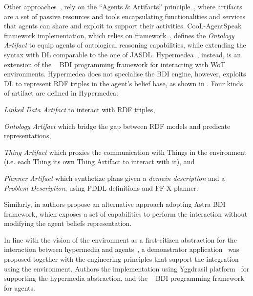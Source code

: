 \documentclass[
]{ceurart}
\begin{document}
%
Other approaches~\cite{DBLP:journals/wias/MascardiABBR14,DBLP:conf/www/CharpenayZLB22, DBLP:conf/semweb/ONeillBBC21, DBLP:conf/emas/CiorteaBR18},
rely on the ``Agents \& Artifacts'' principle~\cite{DBLP:conf/promas/RicciVO05}, 
where artifacts are a set of passive resources and tools encapsulating functionalities and services
that agents can share and exploit to support their activities.
%
CooL-AgentSpeak~\cite{DBLP:journals/wias/MascardiABBR14} framework implementation,
which relies on \cartago{} framework~\cite{DBLP:books/sp/09/RicciPVO09},
defines the \emph{Ontology Artifact} to equip agents of ontological reasoning capabilities,
while extending the syntax with \ac{DL} comparable to the one of JASDL.
%
Hypermedea~\cite{DBLP:conf/www/CharpenayZLB22}, instead,
is an extension of the \jacamo{}~\cite{BOISSIER2013747} \ac{BDI} programming framework
for interacting with \ac{WoT} environments.
%
Hypermedea does not specialise the \ac{BDI} engine, 
however,
exploits \ac{DL} to represent \ac{RDF} triples in the agent's belief base, 
as shown in .
%
Four kinds of artifact are defined in Hypermedea: 
\begin{inlinelist}
  \item \textit{Linked Data Artifact} to interact with \ac{RDF} triples,
  \item \textit{Ontology Artifact} which bridge the gap between \ac{RDF} models and predicate representations,
  \item \textit{Thing Artifact} which proxies the communication with Things in the environment (i.e. each Thing its own Thing Artifact to interact with it), and
  \item \textit{Planner Artifact} which synthetize plans given a \textit{domain description} and a \textit{Problem Description}, using PDDL definitions and FF-X planner. 
\end{inlinelist}
%


Similarly,
in \cite{DBLP:conf/semweb/ONeillBBC21} authors propose an alternative approach adopting Astra \ac{BDI} framework, 
which exposes a set of capabilities to perform the interaction without modifying the agent beliefs representation.

In line with the vision of the environment as a first-citizen abstraction for the interaction between hypermedia and agents~\cite{DBLP:conf/www/CharpenayZLB22},
a demonstrator application~\cite{DBLP:conf/emas/CiorteaBR18} was proposed together with the engineering principles that support the integration using the environment.
%
Authors the implementation using Yggdrasil platform~\cite{ciortea2018emas} for supporting the hypermedia abstraction,
and the \jacamo{}~\cite{BOISSIER2013747} \ac{BDI} programming framework for agents.
\end{document}
